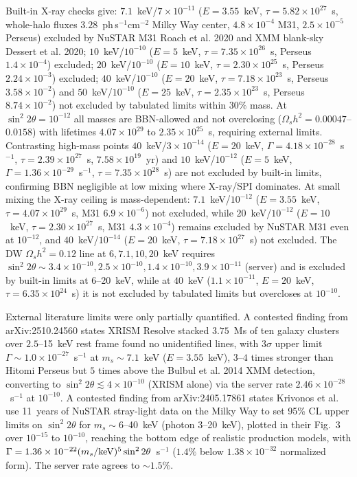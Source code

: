 \documentclass[11pt,a4paper]{article}
\begin{document}
Built-in X-ray checks give: $7.1$~keV/$7\times10^{-11}$ ($E=3.55$~keV, $\tau=5.82\times10^{27}$~s, whole-halo fluxes $3.28$~ph\,s$^{-1}$cm$^{-2}$ Milky Way center, $4.8\times10^{-4}$ M31, $2.5\times10^{-5}$ Perseus) excluded by NuSTAR M31 Roach et al. 2020 and XMM blank-sky Dessert et al. 2020; $10$~keV/$10^{-10}$ ($E=5$~keV, $\tau=7.35\times10^{26}$~s, Perseus $1.4\times10^{-4}$) excluded; $20$~keV/$10^{-10}$ ($E=10$~keV, $\tau=2.30\times10^{25}$~s, Perseus $2.24\times10^{-3}$) excluded; $40$~keV/$10^{-10}$ ($E=20$~keV, $\tau=7.18\times10^{23}$~s, Perseus $3.58\times10^{-2}$) and $50$~keV/$10^{-10}$ ($E=25$~keV, $\tau=2.35\times10^{23}$~s, Perseus $8.74\times10^{-2}$) not excluded by tabulated limits within $30\%$ mass. At $\sin^{2}2\theta=10^{-12}$ all masses are BBN-allowed and not overclosing ($\Omega_{s}h^{2}=0.00047$--$0.0158$) with lifetimes $4.07\times10^{29}$ to $2.35\times10^{25}$~s, requiring external limits. Contrasting high-mass points $40$~keV/$3\times10^{-14}$ ($E=20$~keV, $\Gamma=4.18\times10^{-28}$~s$^{-1}$, $\tau=2.39\times10^{27}$~s, $7.58\times10^{19}$~yr) and $10$~keV/$10^{-12}$ ($E=5$~keV, $\Gamma=1.36\times10^{-29}$~s$^{-1}$, $\tau=7.35\times10^{28}$~s) are not excluded by built-in limits, confirming BBN negligible at low mixing where X-ray/SPI dominates. At small mixing the X-ray ceiling is mass-dependent: $7.1$~keV/$10^{-12}$ ($E=3.55$~keV, $\tau=4.07\times10^{29}$~s, M31 $6.9\times10^{-6}$) not excluded, while $20$~keV/$10^{-12}$ ($E=10$~keV, $\tau=2.30\times10^{27}$~s, M31 $4.3\times10^{-4}$) remains excluded by NuSTAR M31 even at $10^{-12}$, and $40$~keV/$10^{-14}$ ($E=20$~keV, $\tau=7.18\times10^{27}$~s) not excluded. The DW $\Omega_{s}h^{2}=0.12$ line at $6,7.1,10,20$~keV requires $\sin^{2}2\theta\sim3.4\times10^{-10},2.5\times10^{-10},1.4\times10^{-10},3.9\times10^{-11}$ (server) and is excluded by built-in limits at $6$--20~keV, while at $40$~keV ($1.1\times10^{-11}$, $E=20$~keV, $\tau=6.35\times10^{24}$~s) it is not excluded by tabulated limits but overcloses at $10^{-10}$.

External literature limits were only partially quantified. A contested finding from arXiv:2510.24560 states XRISM Resolve stacked $3.75$~Ms of ten galaxy clusters over $2.5$--15~keV rest frame found no unidentified lines, with $3\sigma$ upper limit $\Gamma\sim1.0\times10^{-27}$~s$^{-1}$ at $m_{s}\sim7.1$~keV ($E=3.55$~keV), $3$--$4$ times stronger than Hitomi Perseus but $5$ times above the Bulbul et al. 2014 XMM detection, converting to $\sin^{2}2\theta\lesssim4\times10^{-10}$ (XRISM alone) via the server rate $2.46\times10^{-28}$~s$^{-1}$ at $10^{-10}$. A contested finding from arXiv:2405.17861 states Krivonos et al. use 11~years of NuSTAR stray-light data on the Milky Way to set 95\% CL upper limits on $\sin^{2}2\theta$ for $m_{s}\sim6$--40~keV (photon $3$--20~keV), plotted in their Fig.~3 over $10^{-15}$ to $10^{-10}$, reaching the bottom edge of realistic production models, with $\Gamma=1.36\times10^{-22}(m_{s}/{\rm keV})^{5}\sin^{2}2\theta$~s$^{-1}$ ($1.4\%$ below $1.38\times10^{-32}$ normalized form). The server rate agrees to $\sim1.5\%$.
\end{document}

